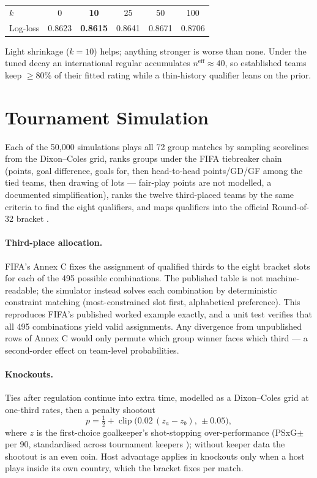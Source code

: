 \documentclass[11pt]{article}
\begin{document}
\begin{center}
\begin{tabular}{lccccc}
\toprule
$k$ & 0 & \textbf{10} & 25 & 50 & 100 \\
Log-loss & 0.8623 & \textbf{0.8615} & 0.8641 & 0.8671 & 0.8706 \\
\bottomrule
\end{tabular}
\end{center}

Light shrinkage ($k{=}10$) helps; anything stronger is worse than none. Under
the tuned decay an international regular accumulates $n^{\mathrm{eff}} \approx 40$,
so established teams keep $\ge 80\%$ of their fitted rating while a thin-history
qualifier leans on the prior.

\section{Tournament Simulation}\label{sec:sim}
Each of the 50{,}000 simulations plays all 72 group matches by sampling
scorelines from the Dixon--Coles grid, ranks groups under the FIFA tiebreaker
chain (points, goal difference, goals for, then head-to-head points/GD/GF among
the tied teams, then drawing of lots --- fair-play points are not modelled, a
documented simplification), ranks the twelve third-placed teams by the same
criteria to find the eight qualifiers, and maps qualifiers into the official
Round-of-32 bracket \cite{wikiknockout}.

\paragraph{Third-place allocation.} FIFA's Annex C \cite{fifaregs} fixes the
assignment of qualified thirds to the eight bracket slots for each of the 495
possible combinations. The published table is not machine-readable; the
simulator instead solves each combination by deterministic constraint matching
(most-constrained slot first, alphabetical preference). This reproduces FIFA's
published worked example exactly, and a unit test verifies that all 495
combinations yield valid assignments. Any divergence from unpublished rows of
Annex C would only permute which group winner faces which third --- a
second-order effect on team-level probabilities.

\paragraph{Knockouts.} Ties after regulation continue into extra time, modelled
as a Dixon--Coles grid at one-third rates, then a penalty shootout
\begin{equation}
  p = \tfrac12 + \operatorname{clip}\bigl(0.02\,(z_a - z_b),\, \pm 0.05\bigr),
\end{equation}
where $z$ is the first-choice goalkeeper's shot-stopping over-performance
(PSxG$\pm$ per 90, standardised across tournament keepers \cite{fbref});
without keeper data the shootout is an even coin. Host advantage applies in
knockouts only when a host plays inside its own country, which the bracket
fixes per match.
\end{document}
